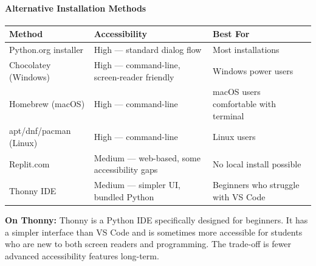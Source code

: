 \documentclass[
  justified,
  openright,
]{tufte-book}
\let\paragraph\paragraph
\let\paragraph\paragraph
\begin{document}
\paragraph{Alternative Installation
Methods}\label{alternative-installation-methods}

\begin{fullwidth}{\def\LTcaptype{none} %
\begin{longtable}[]{@{}
  >{\raggedright\arraybackslash}p{}
  >{\raggedright\arraybackslash}p{}
  >{\raggedright\arraybackslash}p{}@{}}
\toprule\noalign{}
\begin{minipage}[b]{\linewidth}\raggedright
Method
\end{minipage} & \begin{minipage}[b]{\linewidth}\raggedright
Accessibility
\end{minipage} & \begin{minipage}[b]{\linewidth}\raggedright
Best For
\end{minipage} \\
\midrule\noalign{}
\endhead
\bottomrule\noalign{}
\endlastfoot
Python.org installer & High --- standard dialog flow & Most
installations \\
Chocolatey (Windows) & High --- command-line, screen-reader friendly &
Windows power users \\
Homebrew (macOS) & High --- command-line & macOS users comfortable with
terminal \\
apt/dnf/pacman (Linux) & High --- command-line & Linux users \\
Replit.com & Medium --- web-based, some accessibility gaps & No local
install possible \\
Thonny IDE & Medium --- simpler UI, bundled Python & Beginners who
struggle with VS Code \\
\end{longtable}
}\end{fullwidth}

\textbf{On Thonny:} Thonny is a Python IDE specifically designed for
beginners. It has a simpler interface than VS Code and is sometimes more
accessible for students who are new to both screen readers and
programming. The trade-off is fewer advanced accessibility features
long-term. 
\end{document}
